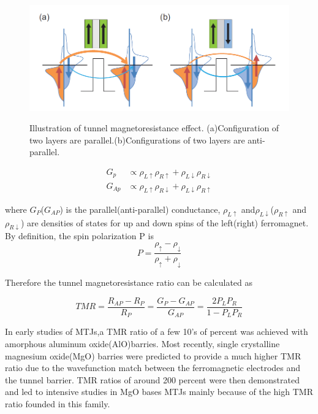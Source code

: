 \begin{figure}[!ht]
\centering
\includegraphics[width=1.0\textwidth]{fig/TMR.PNG}
\label{TMR}
\caption{Illustration of tunnel magnetoresistance effect. (a)Configuration of two layers are parallel.(b)Configurations of two layers are anti-parallel.}
\end{figure}


\begin{equation}
\label{eq:conductance}
\begin{aligned}
G_{p} &\propto  \rho_{L\uparrow}\rho_{R\uparrow}  + \rho_{L\downarrow}\rho_{R\downarrow}
\\
G_{Ap} &\propto  \rho_{L\uparrow}\rho_{R\downarrow}  + \rho_{L\downarrow}\rho_{R\uparrow}
\end{aligned}
\end{equation}


where $G_P$($G_{AP}$) is the parallel(anti-parallel) conductance, $\rho_{L\uparrow}$ and$\rho_{L\downarrow}$($\rho_{R\uparrow}$ and$\rho_{R\downarrow}$) are densities of states for up and down spins of the left(right) ferromagnet. By definition, the spin polarization P is 
\begin{equation}
P = \frac{\rho_{\uparrow} - \rho_{\downarrow}} {\rho_{\uparrow} + \rho_{\downarrow}}
\end{equation}

Therefore the tunnel magnetoresistance ratio can be calculated as

\begin{equation}
TMR = \frac{R_{AP} - R_{P}}{R_{P}}= \frac{G_{P} - G_{AP}}{G_{AP}} = \frac{2P_LP_R}{1-P_LP_R}
\end{equation}

In early studies of MTJs,a TMR ratio of a few 10's of percent was achieved with amorphous aluminum oxide(AlO)barries. Most recently, single crystalline magnesium oxide(MgO) barries were predicted to provide a much higher TMR ratio due to the wavefunction match between the ferromagnetic electrodes and the tunnel barrier. TMR ratios of around 200 percent were then demonstrated and led to intensive studies in MgO bases MTJs mainly because of the high TMR ratio founded in this family\cite{Mg0}.


